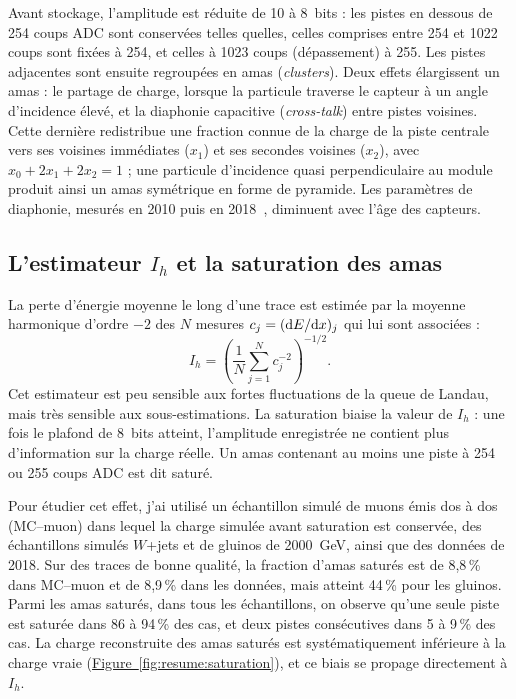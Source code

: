 Avant stockage, l'amplitude est réduite de 10 à 8~bits : les pistes en dessous de 254 coups ADC sont conservées telles quelles, celles comprises entre 254 et 1022 coups sont fixées à 254, et celles à 1023 coups (dépassement) à 255. Les pistes adjacentes sont ensuite regroupées en amas (\textit{clusters}). Deux effets élargissent un amas : le partage de charge, lorsque la particule traverse le capteur à un angle d'incidence élevé, et la diaphonie capacitive (\textit{cross-talk}) entre pistes voisines. Cette dernière redistribue une fraction connue de la charge de la piste centrale vers ses voisines immédiates ($x_1$) et ses secondes voisines ($x_2$), avec $x_0+2x_1+2x_2=1$ ; une particule d'incidence quasi perpendiculaire au module produit ainsi un amas symétrique en forme de pyramide. Les paramètres de diaphonie, mesurés en 2010 puis en 2018~\cite{Xtalk2018CMS}, diminuent avec l'âge des capteurs.

\subsection{L'estimateur \texorpdfstring{$I_h$}{Ih} et la saturation des amas}

La perte d'énergie moyenne le long d'une trace est estimée par la moyenne harmonique d'ordre $-2$ des $N$ mesures $c_j=(\mathrm{d}E/\mathrm{d}x)_j$ qui lui sont associées :
\begin{equation}
    I_h=\left(\frac{1}{N}\sum_{j=1}^{N}c_j^{-2}\right)^{-1/2} .
    \label{eq:resume:ih}
\end{equation}
Cet estimateur est peu sensible aux fortes fluctuations de la queue de Landau, mais très sensible aux sous-estimations. La saturation biaise la valeur de $I_h$ : une fois le plafond de 8~bits atteint, l'amplitude enregistrée ne contient plus d'information sur la charge réelle. Un amas contenant au moins une piste à 254 ou 255 coups ADC est dit saturé.

Pour étudier cet effet, j'ai utilisé un échantillon simulé de muons émis dos à dos (MC--muon) dans lequel la charge simulée avant saturation est conservée, des échantillons simulés $W$+jets et de gluinos de 2000~GeV, ainsi que des données de 2018. Sur des traces de bonne qualité, la fraction d'amas saturés est de 8,8\,\% dans MC--muon et de 8,9\,\% dans les données, mais atteint 44\,\% pour les gluinos. Parmi les amas saturés, dans tous les échantillons, on observe qu'une seule piste est saturée dans 86 à 94\,\% des cas, et deux pistes consécutives dans 5 à 9\,\% des cas. La charge reconstruite des amas saturés est systématiquement inférieure à la charge vraie (\hyperref[fig:resume:saturation]{Figure~\ref*{fig:resume:saturation}}), et ce biais se propage directement à $I_h$.

